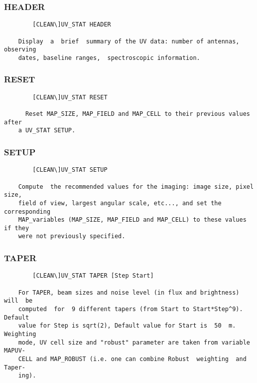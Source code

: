 \subsubsection{HEADER}
\begin{verbatim}
        [CLEAN\]UV_STAT HEADER

    Display  a  brief  summary of the UV data: number of antennas, observing
    dates, baseline ranges,  spectroscopic information.

\end{verbatim}
\subsubsection{RESET}
\begin{verbatim}
        [CLEAN\]UV_STAT RESET

      Reset MAP_SIZE, MAP_FIELD and MAP_CELL to their previous values  after
    a UV_STAT SETUP.

\end{verbatim}
\subsubsection{SETUP}
\begin{verbatim}
        [CLEAN\]UV_STAT SETUP

    Compute  the recommended values for the imaging: image size, pixel size,
    field of view, largest angular scale, etc..., and set the  corresponding
    MAP_variables (MAP_SIZE, MAP_FIELD and MAP_CELL) to these values if they
    were not previously specified.

\end{verbatim}
\subsubsection{TAPER}
\begin{verbatim}
        [CLEAN\]UV_STAT TAPER [Step Start]

    For TAPER, beam sizes and noise level (in flux and brightness)  will  be
    computed  for  9 different tapers (from Start to Start*Step^9).  Default
    value for Step is sqrt(2), Default value for Start is  50  m.  Weighting
    mode, UV cell size and "robust" parameter are taken from variable MAPUV-
    CELL and MAP_ROBUST (i.e. one can combine Robust  weighting  and  Taper-
    ing).

\end{verbatim}
